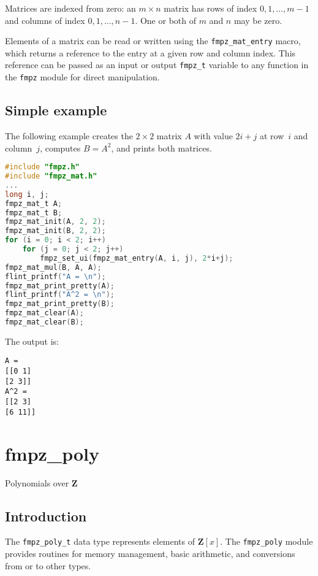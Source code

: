 \documentclass[a4paper,10pt]{book}
\newcommand{\Z}{\mathbf{Z}}%
\newcommand{\code}{\lstinline}
\begin{document}
{{Matrices are indexed from zero: an $m \times n$ matrix
has rows of index $0,1,\ldots,m-1$ and columns of
index $0,1,\ldots,n-1$. One or both of $m$ and $n$ may be zero.

Elements of a matrix can be read or written using the \code{fmpz_mat_entry}
macro, which returns a reference to the entry at a given row and column index.
This reference can be passed as an input or output \code{fmpz_t} variable to
any function in the \code{fmpz} module for direct manipulation.

\section{Simple example}
The following example creates the $2 \times 2$ matrix $A$ with
value $2i+j$ at row~$i$ and column~$j$, computes $B = A^2$,
and prints both matrices.

\begin{lstlisting}[language=c]
#include "fmpz.h"
#include "fmpz_mat.h"
...
long i, j;
fmpz_mat_t A;
fmpz_mat_t B;
fmpz_mat_init(A, 2, 2);
fmpz_mat_init(B, 2, 2);
for (i = 0; i < 2; i++)
    for (j = 0; j < 2; j++)
        fmpz_set_ui(fmpz_mat_entry(A, i, j), 2*i+j);
fmpz_mat_mul(B, A, A);
flint_printf("A = \n");
fmpz_mat_print_pretty(A);
flint_printf("A^2 = \n");
fmpz_mat_print_pretty(B);
fmpz_mat_clear(A);
fmpz_mat_clear(B);
\end{lstlisting}

The output is:
\begin{lstlisting}
A =
[[0 1]
[2 3]]
A^2 =
[[2 3]
[6 11]]
\end{lstlisting}





\chapter{fmpz\_poly}
\epigraph{Polynomials over $\Z$}{}

\section{Introduction}

The \code{fmpz_poly_t} data type represents elements of $\Z[x]$. The
\code{fmpz_poly} module provides routines for memory management, basic
arithmetic, and conversions from or to other types.

}}
\end{document}
